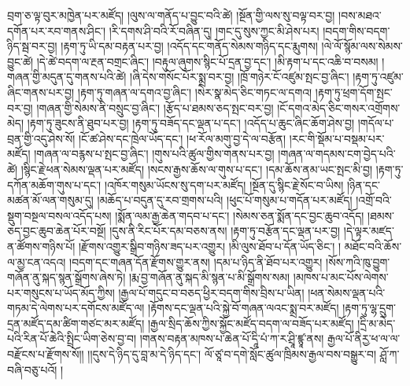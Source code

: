 བྲག་ཅ་ལྟ་བུར་མཁྱེན་པར་མཛོད། །ལུས་ལ་གནོད་པ་བྱུང་བའི་ཚེ། །སྔོན་གྱི་ལས་སུ་བལྟ་བར་བྱ། །བས་མཐའ་དགོན་པར་རབ་གནས་ཤིང་། །རི་དགས་ཤི་བའི་རོ་བཞིན་དུ། །གང་དུ་སུས་ཀྱང་མི་ཤེས་པར། །བདག་གིས་བདག་ཉིད་སྦ་བར་བྱ། །རྟག་ཏུ་ཡི་དམ་བརྟན་པར་བྱ། །འདོད་དང་གནོད་སེམས་གཉིད་དང་རྨུགས། །ལེ་ལོ་སྙོམ་ལས་སེམས་བྱུང་ཚེ། །དེ་ཚེ་བདག་ལ་རྔན་བགྲང་ཞིང་། །བརྟུལ་ཞུགས་སྙིང་པོ་དྲན་བྱ་དང་། །མི་རྟག་པ་དང་འཆི་བ་བསམ། །གཞན་གྱི་མདུན་དུ་གནས་པའི་ཚེ། །ཞི་དེས་གསོང་པོར་སྨྲ་བར་བྱ། །ཁྲོ་གཉེར་ངོ་འཛུམ་སྤང་བྱ་ཞིང་། །རྟག་ཏུ་འཛུམ་ཞིང་གནས་པར་བྱ། །རྟག་ཏུ་གཞན་ལ་དགའ་བྱ་ཞིང་། །སེར་སྣ་མེད་ཅིང་གཏང་ལ་དགའ། །རྟག་ཏུ་ཕྲག་དོག་སྤང་བར་བྱ། །གཞན་གྱི་སེམས་ནི་བསྲུང་བྱ་ཞིང་། །རྩོད་པ་ཐམས་ཅད་སྤང་བར་བྱ། །ངོ་དགའ་མེད་ཅིང་གསར་འགྲོགས་མེད། །རྟག་ཏུ་ཟུངས་ནི་ཐུབ་པར་བྱ། །རྟག་ཏུ་བཟོད་དང་ལྡན་པ་དང་། །འདོད་པ་ཆུང་ཞིང་ཆོག་ཤེས་བྱ། །གདོལ་པ་བྲན་གྱི་འདུ་ཤེས་སོ། །ངོ་ཚ་ཤེས་དང་ཁྲེལ་ཡོད་དང་། །ཕ་རོལ་མགུ་བྱ་དེ་ལ་བརྩོན། །རང་གི་སྡོམ་པ་བསྡམ་པར་མཛོད། །གཞན་ལ་བརྙས་པ་སྤང་བྱ་ཞིང་། །གུས་པའི་ཚུལ་གྱིས་གནས་པར་བྱ། །གཞན་ལ་གདམས་ངག་བྱེད་པའི་ཚེ། །སྙིང་རྗེ་ཕན་སེམས་ལྡན་པར་མཛོད། །སངས་རྒྱས་ཆོས་ལ་གུས་པ་དང་། །དམ་ཆོས་ནམ་ཡང་སྤང་མི་བྱ། །རྟག་ཏུ་དཀོན་མཆོག་གུས་པ་དང་། །འཁོར་གསུམ་ཡོངས་སུ་དག་པར་མཛོད། །སྔོན་དུ་སྙིང་རྗེ་སོང་བ་ཡིས། །ཉིན་དང་མཚན་མོ་ལན་གསུམ་དུ། །མཆོད་པ་བདུན་དུ་རབ་གྲགས་པའི། །ཕུང་པོ་གསུམ་པ་གདོན་པར་མཛོད། །འགྲོ་བའི་སྡུག་བསྔལ་བསལ་འདོད་པས། །སྨོན་ལམ་རྒྱ་ཆེན་གདབ་པ་དང་། །སེམས་ཅན་སྨོན་དང་བྱང་ཆུབ་འདོད། །ཐམས་ཅད་བྱང་ཆུབ་ཆེན་པོར་བསྔོ། །དུས་ནི་རིང་པོར་དམ་བཅས་ནས། །རྟག་ཏུ་བརྩོན་དང་ལྡན་པར་བྱ། །དེ་ལྟར་མཛད་ན་ཚོགས་གཉིས་པོ། །རྫོགས་འགྱུར་སྒྲིབ་གཉིས་ཟད་པར་འགྱུར། །མི་ལུས་ཐོབ་པ་དོན་ཡོད་ཅིང་། །
མཐོང་བའི་ཆོས་ལ་མྱ་ངན་འདའ། །བདག་དང་གཞན་དོན་རྫོགས་གྱུར་ནས། །དམ་པ་ཉིད་ནི་ཐོབ་པར་འགྱུར། །སོས་ཀའི་ཁུ་བྱུག་གཞོན་ནུ་སྐད་སྙན་སྒྲོགས་ཞེས་ཏེ། །རྨ་བྱ་གཞོན་ནུ་སྐད་མི་སྙན་པ་མི་སྒྲོགས་སམ། །མཁས་པ་མང་པོས་ལེགས་པར་གསུངས་པ་ཡོད་མོད་ཀྱིས། །རྒྱལ་པོ་གདུང་བ་བཅད་ཕྱིར་བདག་གིས་བྲིས་པ་ཡིན། །ཕན་སེམས་ལྡན་པའི་གཏམ་དེ་ལེགས་པར་དགོངས་མཛོད་ལ། །རྟོགས་དང་ལྡན་པའི་སྐྱེ་བོ་གཞན་ལའང་སྨྲ་བར་མཛོད། །རྟག་ཏུ་ལྷ་དྲུག་དྲན་མཛོད་དམ་ཚིག་གཙང་མར་མཛོད། །རྒྱལ་སྲིད་ཆོས་ཀྱིས་སྐྱོང་མཛོད་བདག་ལ་བཟོད་པར་མཛོད། །དྲི་མ་མེད་པའི་རིན་པོ་ཆེའི་སྤྲིང་ཡིག་ཅེས་བྱ་བ། །གནས་བརྟན་མཁས་པ་ཆེན་པོ་དཱི་པཾ་ཀ་ར་ཤྲཱི་ཛྙཱ་ནས། རྒྱལ་པོ་ནིརྱ་ཕ་ལ་ལ་བརྫོངས་པ་རྫོགས་སོ།། །།དུས་དེ་ཉིད་དུ་བླ་མ་དེ་ཉིད་དང་། ལོ་ཙཱ་བ་དགེ་སློང་ཚུལ་ཁྲིམས་རྒྱལ་བས་བསྒྱུར་བ། ཤློ་ཀ་བཞི་བཅུ་པའོ། །